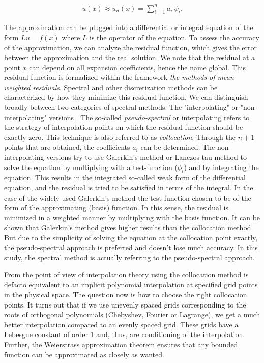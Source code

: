 \begin{align}
u(x) \approx u_n(x) = \sum_{i=1}^{n} a_i \, \psi_i. 
\label{eq:approx}
\end{align}

The approximation can be plugged into a differential or integral equation of
the form $Lu=f(x)$ where $L$ is the operator of the equation. To assess the
accuracy of the approximation, we can analyze the residual function, which
gives the error between the approximation and the real solution. We note that
the residual at a point $x$ can depend on all expansion coefficients, hence the
name global. This residual function is formalized within the framework
\emph{the methods of mean weighted residuals}. Spectral and other
discretization methods can be characterized by how they minimize this residual
function. We can distinguish broadly between two categories of spectral
methods. The "interpolating" or "non-interpolating" versions \citep{boyd2001}.
The so-called \emph{pseudo-spectral} or interpolating refers to the strategy of
interpolation points on which the residual function should be exactly zero.
This technique is also referred to as \emph{collocation}. Through the $n+1$
points that are obtained, the coefficients $a_i$ can be determined. The
non-interpolating versions try to use Galerkin's method or Lanczos tau-method
to solve the equation by multiplying with a test-function ($\phi_i$) and by
integrating the equation. This results in the integrated so-called weak form of
the differential equation, and the residual is tried to be satisfied in terms
of the integral. In the case of the widely used Galerkin's method the test
function chosen to be of the form of the approximating (basis) function. In
this sense, the residual is minimized in a weighted manner by multiplying with
the basis function. It can be shown that Galerkin's method gives higher results
than the collocation method. But due to the simplicity of solving the equation
at the collocation point exactly, the pseudo-spectral approach is preferred and
doesn't lose much accuracy. In this study, the spectral method is actually
referring to the pseudo-spectral approach.

From the point of view of interpolation theory using the collocation method is
defacto equivalent to an implicit polynomial interpolation at specified grid
points in the physical space. The question now is how to choose the right
collocation points. It turns out that if we use unevenly spaced grids
corresponding to the roots of orthogonal polynomials (Chebyshev, Fourier or
Lagrange), we get a much better interpolation compared to an evenly spaced
grid. These grids have a Lebesgue constant of order $1$ and, thus, are
conditioning of the interpolation. Further, the Weierstrass approximation
theorem ensures that any bounded function can be approximated as closely as
wanted.

